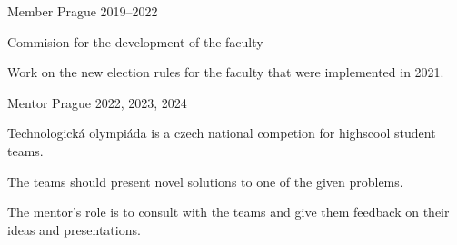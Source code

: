

\cventry
    {Member} %
    {} %
    {Prague} %
    {2019--2022} %
    {
      \begin{cvitems} %
        \item {Commision for the development of the faculty}
        \item {Work on the new election rules for the faculty that were implemented in 2021.}
      \end{cvitems}
    }

\cventry
    {Mentor} %
    {} %
    {Prague} %
    {2022, 2023, 2024} %
    {
      \begin{cvitems} %
        \item {Technologická olympiáda is a czech national competion for highscool student teams.}
        \item {The teams should present novel solutions to one of the given problems.}
        \item {The mentor's role is to consult with the teams and give them feedback on their ideas and presentations.}
      \end{cvitems}
    }




